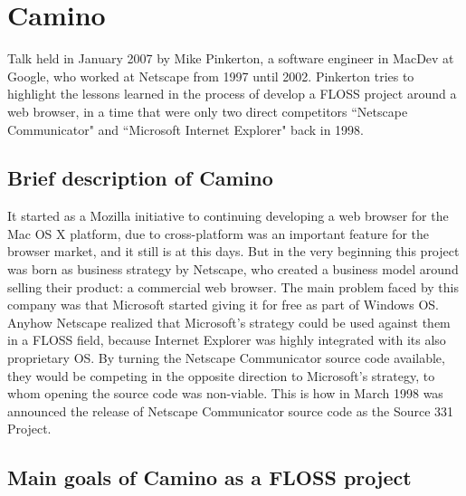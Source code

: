\documentclass[11pt]{article} %
\begin{document}
\section{Camino}

Talk held in January 2007 by Mike Pinkerton, a software engineer in MacDev at Google, who worked at Netscape from 1997 until 2002. Pinkerton tries to highlight the lessons learned in the process of develop a FLOSS project around a web browser, in a time that were only two direct competitors ``Netscape Communicator" and ``Microsoft Internet Explorer" back in 1998.

\subsection{Brief description of Camino}

It started as a Mozilla initiative to continuing developing a web browser for the Mac OS X platform, due to cross-platform was an important feature for the browser market, and it still is at this days. But in the very beginning this project was born as business strategy by Netscape, who created a business model around selling their product: a commercial web browser. The main problem faced by this company was that Microsoft started giving it for free as part of Windows OS. Anyhow Netscape realized that Microsoft's strategy could be used against them in a FLOSS field, because Internet Explorer was highly integrated with its also proprietary OS. By turning the Netscape Communicator source code available, they would be competing in the opposite direction to Microsoft's strategy, to whom opening the source code was non-viable. This is how in March 1998 was announced the release of Netscape Communicator source code as the Source 331 Project.

\subsection{Main goals of Camino as a FLOSS project}
\end{document}

